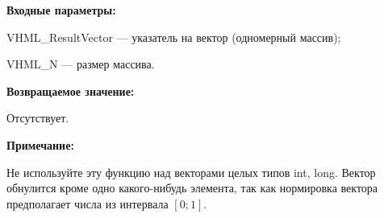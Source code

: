 \textbf{Входные параметры:}

 VHML\_ResultVector --- указатель на вектор (одномерный массив);
 
 VHML\_N --- размер массива.

\textbf{Возвращаемое значение:} 
 
Отсутствует.

\textbf{Примечание:} 

Не используйте эту функцию над векторами целых типов int, long. Вектор обнулится кроме одно какого-нибудь элемента, так как нормировка вектора предполагает числа из интервала $[0;1]$.